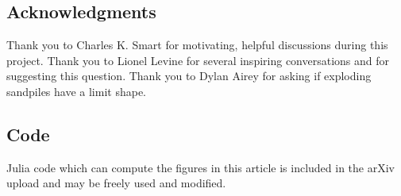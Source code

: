 \documentclass[12pt]{amsart}
\begin{document}
\subsection*{Acknowledgments}
Thank you to Charles K. Smart for motivating, helpful discussions 
during this project. Thank you to Lionel Levine for several
inspiring conversations and for suggesting this question.  Thank you to Dylan Airey for asking if exploding sandpiles have a limit shape. 



\subsection*{Code}
Julia code which can compute the figures in this article is included in the arXiv upload and may be freely used
and modified.
\end{document}

